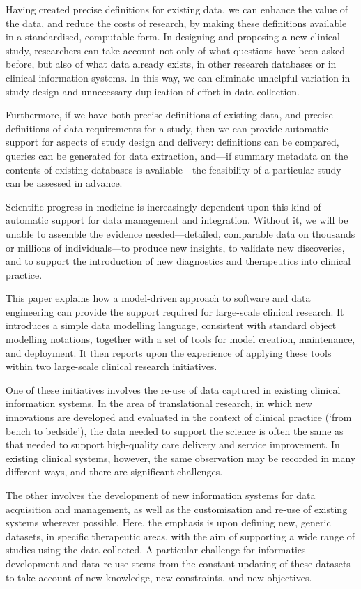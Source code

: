Having created precise definitions for existing data, we can enhance
the value of the data, and reduce the costs of research, by making
these definitions available in a standardised, computable form.  In
designing and proposing a new clinical study, researchers can take
account not only of what questions have been asked before, but also of
what data already exists, in other research databases or in clinical
information systems.  In this way, we can eliminate unhelpful
variation in study design and unnecessary duplication of effort in
data collection.

Furthermore, if we have both precise definitions of existing data, and
precise definitions of data requirements for a study, then we can
provide automatic support for aspects of study design and delivery:
definitions can be compared, queries can be generated for data
extraction, and---if summary metadata on the contents of existing
databases is available---the feasibility of a particular study can be
assessed in advance.

Scientific progress in medicine is increasingly dependent upon this
kind of automatic support for data management and integration.
Without it, we will be unable to assemble the evidence
needed---detailed, comparable data on thousands or millions of
individuals---to produce new insights, to validate new discoveries,
and to support the introduction of new diagnostics and therapeutics
into clinical practice.


This paper explains how a model-driven approach to software and data
engineering can provide the support required for large-scale clinical
research.  It introduces a simple data modelling language, consistent
with standard object modelling notations, together with a set of tools
for model creation, maintenance, and deployment.  It then reports upon
the experience of applying these tools within two large-scale clinical
research initiatives.

One of these initiatives involves the re-use of data captured in
existing clinical information systems.  In the area of translational
research, in which new innovations are developed and evaluated in the
context of clinical practice (`from bench to bedside'), the data
needed to support the science is often the same as that needed to
support high-quality care delivery and service improvement.  In
existing clinical systems, however, the same observation may be
recorded in many different ways, and there are significant
challenges. 

The other involves the development of new information systems for data
acquisition and management, as well as the customisation and re-use of
existing systems wherever possible.  Here, the emphasis is upon
defining new, generic datasets, in specific therapeutic areas, with
the aim of supporting a wide range of studies using the data
collected.  A particular challenge for informatics development and
data re-use stems from the constant updating of these datasets to take
account of new knowledge, new constraints, and new objectives.

